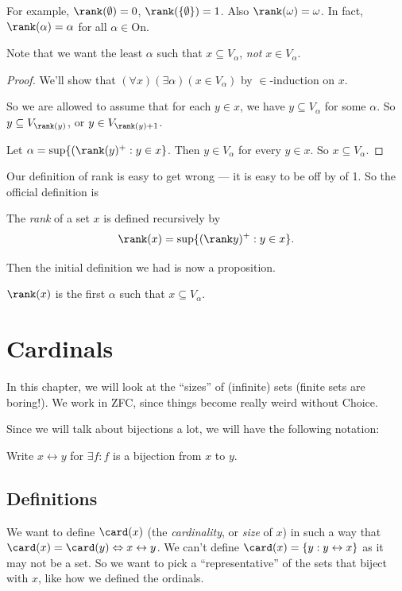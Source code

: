 \documentclass[a4paper]{article}
\begin{document}
For example, $\rank(\emptyset) = 0$, $\rank(\{\emptyset\}) = 1$. Also $\rank(\omega) = \omega$. In fact, $\rank(\alpha) = \alpha$ for all $\alpha\in \mathrm{On}$.

Note that we want the least $\alpha$ such that $x\subseteq V_\alpha$, \emph{not} $x\in V_\alpha$.

\begin{proof}
  We'll show that $(\forall x)(\exists \alpha)(x\in V_\alpha)$ by $\in$-induction on $x$.

  So we are allowed to assume that for each $y\in x$, we have $y\subseteq V_\alpha$ for some $\alpha$. So $y\subseteq V_{\rank(y)}$, or $y\in V_{\rank(y) + 1}$.

  Let $\alpha = \sup\{(\rank(y)^+: y\in x\}$. Then $y\in V_\alpha$ for every $y\in x$. So $x\subseteq V_\alpha$.
\end{proof}

Our definition of rank is easy to get wrong --- it is easy to be off by of 1. So the official definition is
\begin{defi}[Rank]
  The \emph{rank} of a set $x$ is defined recursively by
  \[
    \rank(x) = \sup\{(\rank y)^+ : y\in x\}.
  \]
\end{defi}

Then the initial definition we had is now a proposition.
\begin{prop}
  $\rank(x)$ is the first $\alpha$ such that $x\subseteq V_\alpha$.
\end{prop}

\section{Cardinals}
In this chapter, we will look at the ``sizes'' of (infinite) sets (finite sets are boring!). We work in ZFC, since things become really weird without Choice.

Since we will talk about bijections a lot, we will have the following notation:
\begin{notation}
  Write $x\leftrightarrow y$ for $\exists f: f$ is a bijection from $x$ to $y$.
\end{notation}

\subsection{Definitions}
We want to define $\card(x)$ (the \emph{cardinality}, or \emph{size} of $x$) in such a way that $\card(x) = \card(y) \Leftrightarrow x\leftrightarrow y$. We can't define $\card(x) = \{y: y\leftrightarrow x\}$ as it may not be a set. So we want to pick a ``representative'' of the sets that biject with $x$, like how we defined the ordinals.
\end{document}
